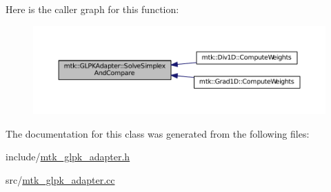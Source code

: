 Here is the caller graph for this function\+:\nopagebreak
\begin{figure}[H]
\begin{center}
\leavevmode
\includegraphics[width=350pt]{classmtk_1_1GLPKAdapter_a834480aca83e3c0d09fdab7fdb7e8a3f_icgraph}
\end{center}
\end{figure}




The documentation for this class was generated from the following files\+:\begin{DoxyCompactItemize}
\item 
include/\hyperlink{mtk__glpk__adapter_8h}{mtk\+\_\+glpk\+\_\+adapter.\+h}\item 
src/\hyperlink{mtk__glpk__adapter_8cc}{mtk\+\_\+glpk\+\_\+adapter.\+cc}\end{DoxyCompactItemize}
